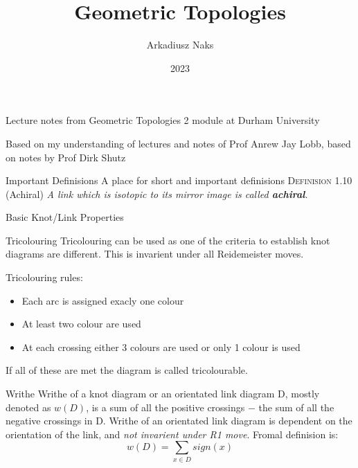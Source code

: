 \documentclass[12pt, letterpaper]{article}
\title{Geometric Topologies}
\author{Arkadiusz Naks}
\date{2023}
\begin{document}
\begin{titlepage}
  \begin{center}
    \makeatletter
    \vspace*{1cm}
    \Huge
    \textbf{\@title}

    \vspace{0.5cm}
    \Large
    Lecture notes from Geometric Topologies 2 module at Durham University

    \vspace{1.5cm}

    \textbf{\@author}

    \vfill

    \vspace{0.8cm}

    \small
    Based on my understanding of lectures and notes of Prof Anrew Jay Lobb, based on notes by Prof Dirk Shutz\\
    \@date{}
  \end{center}
\end{titlepage}

\tableofcontents
\newpage

\begin{section}{Important Definisions}
  A place for short and important definisions
  \textsc{Definision 1.10} (Achiral) \textit{A link which is isotopic to its mirror image is called \textbf{achiral}.}
\end{section}

\begin{section}{Basic Knot/Link Properties}

  \begin{subsection}{Tricolouring}
    Tricolouring can be used as one of the criteria to establish knot diagrams are different.
    This is invarient under all Reidemeister moves.

    Tricolouring rules:
    \begin{itemize}
      \item Each arc is assigned exacly one colour
      \item At least two colour are used
      \item At each crossing either 3 colours are used or only 1 colour is used
    \end{itemize}
    If all of these are met the diagram is called tricolourable.
  \end{subsection}

  \begin{subsection}{Writhe}
    Writhe of a knot diagram or an orientated link diagram D, mostly denoted as \(w(D)\),
    is a sum of all the positive crossings \(-\) the sum of all the negative crossings in D.
    Writhe of an orientated link diagram is dependent on the orientation of the link,
    and \emph{not invarient under R1 move}.
    Fromal definision is: \[w(D) = \sum_{x \in D} sign(x)\]
  \end{subsection}

\end{section}
\end{document}
